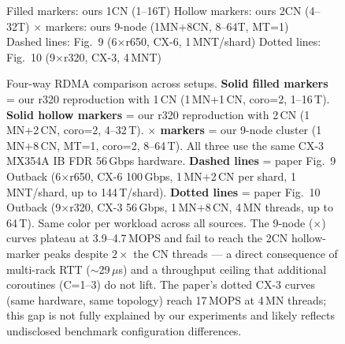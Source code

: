 \documentclass[conference]{IEEEtran}
\begin{document}
\begin{figure}[t]
\vspace{2pt}
\parbox{0.92\textwidth}{\centering\scriptsize
Filled markers: ours 1CN (1--16T) \quad Hollow markers: ours 2CN (4--32T) \quad $\times$ markers: ours 9-node (1MN+8CN, 8--64T, MT=1) \\
Dashed lines: Fig.~9 (6$\times$r650, CX-6, 1\,MNT/shard) \quad Dotted lines: Fig.~10 (9$\times$r320, CX-3, 4\,MNT)
}
\caption{Four-way RDMA comparison across setups. \textbf{Solid filled markers} = our r320 reproduction with 1\,CN (1\,MN+1\,CN, coro=2, 1--16\,T). \textbf{Solid hollow markers} = our r320 reproduction with 2\,CN (1\,MN+2\,CN, coro=2, 4--32\,T). \textbf{$\times$ markers} = our 9-node cluster (1\,MN+8\,CN, MT=1, coro=2, 8--64\,T). All three use the same CX-3 MX354A IB FDR 56\,Gbps hardware. \textbf{Dashed lines} = paper Fig.~9 Outback (6$\times$r650, CX-6 100\,Gbps, 1\,MN+2\,CN per shard, 1\,MNT/shard, up to 144\,T/shard). \textbf{Dotted lines} = paper Fig.~10 Outback (9$\times$r320, CX-3 56\,Gbps, 1\,MN+8\,CN, 4\,MN threads, up to 64\,T). Same color per workload across all sources. The 9-node ($\times$) curves plateau at 3.9--4.7\,MOPS and fail to reach the 2CN hollow-marker peaks despite $2\times$ the CN threads --- a direct consequence of multi-rack RTT ($\sim$29\,$\mu$s) and a throughput ceiling that additional coroutines (C=1--3) do not lift. The paper's dotted CX-3 curves (same hardware, same topology) reach 17\,MOPS at 4\,MN threads; this gap is not fully explained by our experiments and likely reflects undisclosed benchmark configuration differences.}
\label{fig:rdma-ycsb-all}
\end{figure}
\end{document}
